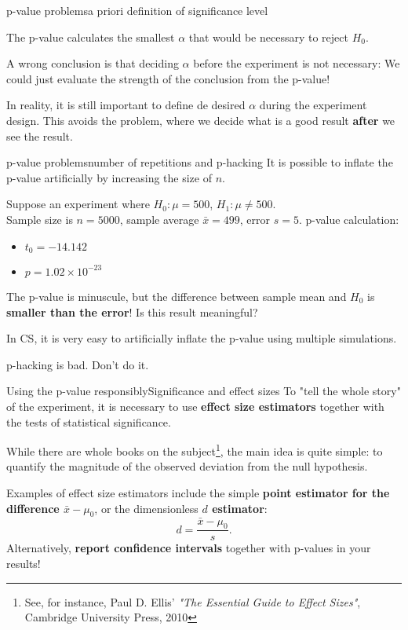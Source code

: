 \begin{frame}{p-value problems}{a priori definition of significance level}

  The p-value calculates the smallest $\alpha$ that would be necessary to reject $H_0$.\bigskip

  A wrong conclusion is that deciding $\alpha$ before the experiment is not necessary: We could just evaluate the strength of the conclusion from the p-value!\bigskip

  In reality, it is still important to define de desired $\alpha$ during the experiment design. This avoids the  problem, where we decide what is a good result {\bf after} we see the result.
\end{frame}

\begin{frame}{p-value problems}{number of repetitions and p-hacking}
  It is possible to \alert{inflate the p-value artificially} by increasing the size of $n$.\bigskip

  Suppose an experiment where $H_0: \mu = 500$, $H_1: \mu \neq 500$.\\
  Sample size is $n=5000$, sample average $\bar{x} = 499$, error $s=5$. p-value calculation:\medskip

  \begin{itemize}
    \item $t_0 = -14.142$
    \item $p = 1.02 \times 10^{-23}$
  \end{itemize}\bigskip

  The p-value is minuscule, but the difference between sample mean and $H_0$ is {\bf smaller than the error}! \alert{Is this result meaningful?}\bigskip

  In CS, it is very easy to artificially inflate the p-value using multiple simulations.\bigskip

  \hfill p-hacking is bad. Don't do it.
\end{frame}

\begin{frame}{Using the p-value responsibly}{Significance and effect sizes}
  To "tell the whole story" of the experiment, it is necessary to use {\bf effect size estimators} together with the tests of statistical significance.\bigskip

  While there are whole books on the subject\footnote{See, for instance, Paul D. Ellis' \emph{"The Essential Guide to Effect Sizes"}, Cambridge University Press, 2010}, the main idea is quite simple: to quantify the magnitude of the observed deviation from the null hypothesis.\bigskip

  Examples of effect size estimators include the simple {\bf point estimator for the difference $\bar{x} - \mu_0$}, or the dimensionless {\bf $d$ estimator}:
  \begin{equation*}
    d = \frac{\bar{x} - \mu_0}{s}.
  \end{equation*}
  Alternatively, {\bf report confidence intervals} together with p-values in your results!
\end{frame}



